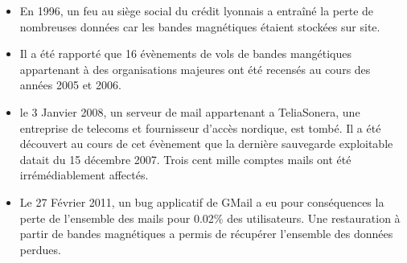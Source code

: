 \documentclass[a4paper,11pt]{report}
\begin{document}
\begin{itemize}
\item En 1996, un feu au siège social du crédit lyonnais a entraîné la perte de nombreuses données car les bandes magnétiques étaient stockées sur site.
\item Il a été rapporté que 16 évènements de vols de bandes mangétiques appartenant à des organisations majeures ont été recensés au cours des années 2005 et 2006.
\item le 3 Janvier 2008, un serveur de mail appartenant a TeliaSonera, une entreprise de telecoms et fournisseur d'accès nordique, est tombé. Il a été découvert au cours de cet évènement que la dernière sauvegarde exploitable datait du 15 décembre 2007. Trois cent mille comptes mails ont été irrémédiablement affectés. 
\item Le 27 Février 2011, un bug applicatif de GMail a eu pour conséquences la perte de l'ensemble des mails pour 0.02\% des utilisateurs. Une restauration à partir de bandes magnétiques a permis de récupérer l'ensemble des données perdues.
\end{itemize}

\begin{abstract}
\end{abstract}
\end{document}
